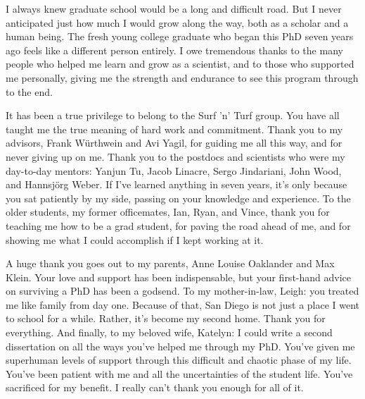 \begin{frontmatter}
%
\tableofcontents
\listoffigures  %
\listoftables   %



%
%
\begin{acknowledgements}
I always knew graduate school would be a long and difficult road. But I
never anticipated just how much I would grow along the way, both
as a scholar and a human being. The fresh young college
graduate who began this PhD seven years ago feels like a different
person entirely. I owe tremendous thanks to the many people who helped me learn
and grow as a scientist, and to those who
supported me personally, giving me the strength and endurance to see
this program through to the end.

It has been a true privilege to belong to the Surf 'n' Turf
group. You have all taught me the true meaning of hard work and
commitment. Thank you to my advisors, Frank W\"{u}rthwein and Avi
Yagil, for guiding me all this way, and for never giving up on
me. Thank you to the postdocs and scientists who were my day-to-day
mentors: Yanjun Tu, Jacob Linacre, Sergo Jindariani, John Wood, and
Hannsj\"{o}rg Weber. If I've learned anything in seven years, it's
only because you sat patiently by my side, passing on your knowledge
and experience. To the older students, my former officemates, Ian,
Ryan, and Vince, thank you for teaching me how to be a grad student,
for paving the road ahead of me, and for showing me
what I could accomplish if I kept working at it.

A huge thank you goes out to my parents, Anne Louise Oaklander and Max
Klein. Your love and support has been indispensable, but your
first-hand advice on surviving a PhD has been a godsend.
To my mother-in-law, Leigh: you treated me like family from day one.
Because of that, San Diego is not just a place I went to
school for a while. Rather, it's become my second home. Thank you for everything.
And finally, to my beloved wife, Katelyn: I could write a second
dissertation on all the ways you've helped me through my PhD.
You've given me superhuman levels of support through this difficult
and chaotic phase of my life. You've been patient with me and all the
uncertainties of the student life. You've sacrificed for my benefit. I
really can't thank you enough for all of it.


\end{acknowledgements}
\end{frontmatter}
